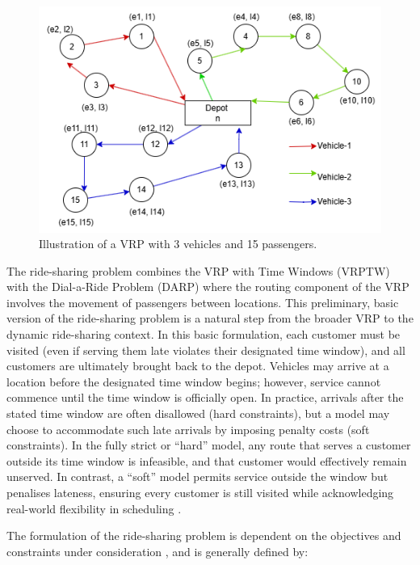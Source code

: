 \begin{figure}[htbp]
    \centering
    \includegraphics[scale=0.6]{Crest/Images/ride-share_illustration.png}
    \caption{Illustration of a VRP with 3 vehicles and 15 passengers.}
    \label{fig:vrptw}
\end{figure}

The ride-sharing problem combines the VRP with Time Windows (VRPTW) with the Dial-a-Ride Problem (DARP) \cite{paparella2024congestion} where the routing component of the VRP involves the movement of passengers between locations. This preliminary, basic version of the ride-sharing problem is a natural step from the broader VRP to the dynamic ride-sharing context. In this basic formulation, each customer must be visited (even if serving them late violates their designated time window), and all customers are ultimately brought back to the depot. Vehicles may arrive at a location before the designated time window begins; however, service cannot commence until the time window is officially open. In practice, arrivals after the stated time window are often disallowed (hard constraints), but a model may choose to accommodate such late arrivals by imposing penalty costs (soft constraints). In the fully strict or “hard” model, any route that serves a customer outside its time window is infeasible, and that customer would effectively remain unserved. In contrast, a “soft” model permits service outside the window but penalises lateness, ensuring every customer is still visited while acknowledging real-world flexibility in scheduling \cite{soa_rideshare}.

The formulation of the ride-sharing problem is dependent on the objectives and constraints under consideration \cite{asghari2021green}, and is generally defined by: 

